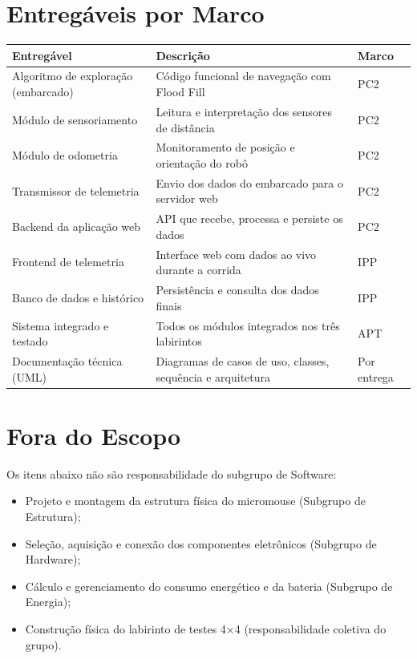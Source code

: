 \documentclass[a4paper,12pt]{article}
\begin{document}
\section{Entregáveis por Marco}

\begin{longtable}{|p{4cm}|p{7cm}|p{2cm}|}
\hline
\textbf{Entregável} & \textbf{Descrição} & \textbf{Marco} \\
\hline
Algoritmo de exploração (embarcado) & Código funcional de navegação com Flood Fill & PC2 \\
\hline
Módulo de sensoriamento & Leitura e interpretação dos sensores de distância & PC2 \\
\hline
Módulo de odometria & Monitoramento de posição e orientação do robô & PC2 \\
\hline
Transmissor de telemetria & Envio dos dados do embarcado para o servidor web & PC2 \\
\hline
Backend da aplicação web & API que recebe, processa e persiste os dados & PC2 \\
\hline
Frontend de telemetria & Interface web com dados ao vivo durante a corrida & IPP \\
\hline
Banco de dados e histórico & Persistência e consulta dos dados finais & IPP \\
\hline
Sistema integrado e testado & Todos os módulos integrados nos três labirintos & APT \\
\hline
Documentação técnica (UML) & Diagramas de casos de uso, classes, sequência e arquitetura & Por entrega \\
\hline
\end{longtable}

\section{Fora do Escopo}

Os itens abaixo não são responsabilidade do subgrupo de Software:

\begin{itemize}
    \item Projeto e montagem da estrutura física do micromouse (Subgrupo de Estrutura);
    \item Seleção, aquisição e conexão dos componentes eletrônicos (Subgrupo de Hardware);
    \item Cálculo e gerenciamento do consumo energético e da bateria (Subgrupo de Energia);
    \item Construção física do labirinto de testes 4×4 (responsabilidade coletiva do grupo).
\end{itemize}
\end{document}
